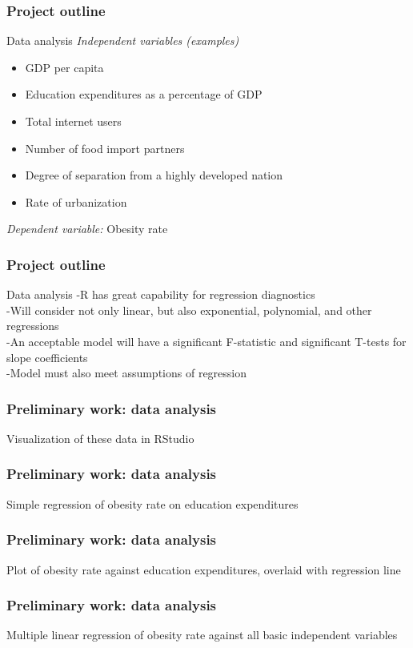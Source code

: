 \documentclass{beamer}
\begin{document}
\begin{frame}
\frametitle{Project outline}
\begin{block}
{Data analysis}
{\emph {Independent variables (examples)}}
\begin{itemize}
\item GDP per capita
\item Education expenditures as a percentage of GDP
\item Total internet users
\item Number of food import partners
\item Degree of separation from a highly developed nation
\item Rate of urbanization
\end{itemize}

{\emph {Dependent variable:}} Obesity rate
\end{block}
\end{frame}

\begin{frame}
\frametitle{Project outline}
\begin{block}
{Data analysis}
-R has great capability for regression diagnostics
\\
-Will consider not only linear, but also exponential, polynomial, and other regressions
\\
-An acceptable model will have a significant F-statistic and significant T-tests for slope coefficients
\\
-Model must also meet assumptions of regression
\end{block}
\end{frame}

\begin{frame}
\frametitle{Preliminary work: data analysis}
Visualization of these data in RStudio
\end{frame}

\begin{frame}
\frametitle{Preliminary work: data analysis}
Simple regression of obesity rate on education expenditures
\end{frame}

\begin{frame}
\frametitle{Preliminary work: data analysis}
Plot of obesity rate against education expenditures, overlaid with regression line
\end{frame}

\begin{frame}
\frametitle{Preliminary work: data analysis}
Multiple linear regression of obesity rate against all basic independent variables
\end{frame}
\end{document}
